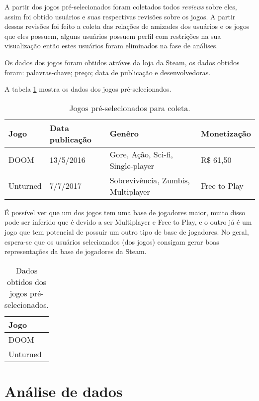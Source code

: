 \documentclass[12pt]{article}
\begin{document}
A partir dos jogos pré-selecionados foram coletados todos \textit{reviews} sobre eles, assim foi obtido usuários e suas respectivas revisões sobre os jogos. A partir dessas revisões foi feito a coleta das relações de amizades dos usuários e os jogos que eles possuem, alguns usuários possuem perfil com restrições na sua visualização então estes usuários foram eliminados na fase de análises.

Os dados dos jogos foram obtidos atráves da loja da Steam, os dados obtidos foram: palavras-chave; preço; data de publicação e desenvolvedoras.

A tabela \ref{tab:preselection1} mostra os dados dos jogos pré-selecionados.

\begin{table}[ht]
\centering
\caption{Jogos pré-selecionados para coleta.}
\label{tab:preselection1}
\begin{tabular}{|l|l|l|l|}
				\hline
				Jogo & Data publicação & Genêro & Monetização \\\hline
				DOOM & 13/5/2016  & Gore, Ação, Sci-fi, Single-player & R\$ 61,50 \\\hline
				Unturned & 7/7/2017  & Sobrevivência, Zumbis, Multiplayer & Free to Play \\\hline
\end{tabular}
\end{table}

É possível ver que um dos jogos tem uma base de jogadores maior, muito disso pode ser inferido que é devido a ser Multiplayer e Free to Play, e o outro já é um jogo que tem potencial de possuir um outro tipo de base de jogadores. No geral, espera-se que os usuários selecionados (dos jogos) consigam gerar boas representações da base de jogadores da Steam.


\begin{table}[ht]
\centering
\caption{Dados obtidos dos jogos pré-selecionados.}
\label{tab:datajogos}
\begin{tabular}{|l|}
				\hline
				Jogo     \\\hline
				DOOM     \\\hline
				Unturned  \\\hline
\end{tabular}
\end{table}

\section{Análise de dados}
\end{document}

